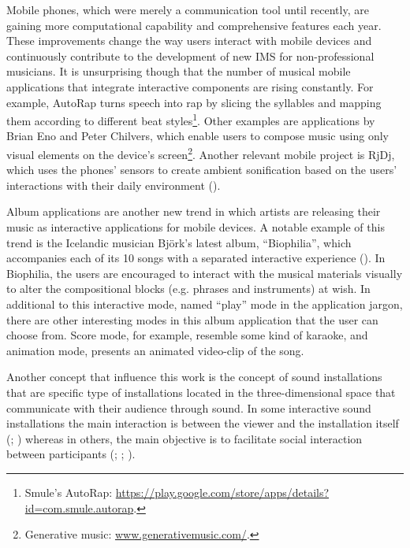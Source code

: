 \documentclass[a4paper,11pt]{article}
\begin{document}
Mobile phones, which were merely a communication tool until recently, are gaining more computational capability and comprehensive features each year.
These improvements change the way users interact with mobile devices and continuously contribute to the development of new IMS for non-professional musicians.
It is unsurprising though that the number of musical mobile applications that integrate interactive components are rising constantly.
For example, AutoRap turns speech into rap by slicing the syllables and mapping them according to different beat styles\footnote{Smule's AutoRap: \href{https://play.google.com/store/apps/details?id=com.smule.autorap}{https://play.google.com/store/apps/details?id=com.smule.autorap}.}.
Other examples are applications by Brian Eno and Peter Chilvers, which enable users to compose music using only visual elements on the device's screen\footnote{Generative music: \href{http://www.generativemusic.com/}{www.generativemusic.com/}.}.
Another relevant mobile project is RjDj, which uses the phones' sensors to create ambient sonification based on the users' interactions with their daily environment (\cite{web:rjdj})\label{rjdj}.

Album applications are another new trend in which artists are releasing their music as interactive applications for mobile devices.
A notable example of this trend is the Icelandic musician Bj\"{o}rk's latest album, ``Biophilia'', which accompanies each of its 10 songs with a separated interactive experience (\cite{stimulant13}).
In Biophilia, the users are encouraged to interact with the musical materials visually to alter the compositional blocks (e.g. phrases and instruments) at wish.
In additional to this interactive mode, named ``play'' mode in the application jargon, there are other interesting modes in this album application that the user can choose from.
Score mode, for example, resemble some kind of karaoke, and animation mode, presents an animated video-clip of the song.

Another concept that influence this work is the concept of sound installations that are specific type of installations located in the three-dimensional space that communicate with their audience through sound.
In some interactive sound installations the main interaction is between the viewer and the installation itself (\cite{web:visnjic}; \cite{web:cardiff01}) whereas in others, the main objective is to facilitate social interaction between participants (\cite{eng03}; \cite{web:kirn12}; \cite{web:murray-browne13}).
\end{document}
